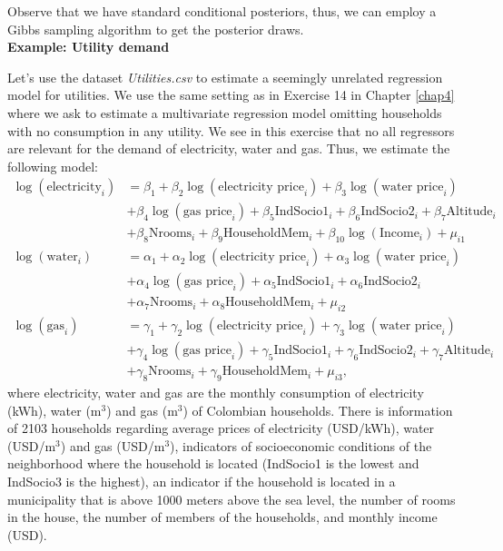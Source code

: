 Observe that we have standard conditional posteriors, thus, we can employ a Gibbs sampling algorithm to get the posterior draws.\\

\textbf{Example: Utility demand}

Let's use the dataset \textit{Utilities.csv} to estimate a seemingly unrelated regression model for utilities. We use the same setting as in Exercise 14 in Chapter \ref{chap4} where we ask to estimate a multivariate regression model omitting households with no consumption in any utility. We see in this exercise that no all regressors are relevant for the demand of electricity, water and gas. Thus, we estimate the following model:
\begin{align*}
	\log(\text{electricity}_i) & = \beta_1 + \beta_2\log(\text{electricity price}_i)+\beta_3\log(\text{water price}_i)\\
	&+\beta_4\log(\text{gas price}_i)+\beta_5\text{IndSocio1}_i+\beta_6\text{IndSocio2}_i+\beta_7\text{Altitude}_i\\
	&+\beta_8\text{Nrooms}_i+\beta_9\text{HouseholdMem}_i+\beta_{10}\log(\text{Income}_i)+\mu_{i1}\\
	\log(\text{water}_i) & = \alpha_1 + \alpha_2\log(\text{electricity price}_i)+\alpha_3\log(\text{water price}_i)\\
	&+\alpha_4\log(\text{gas price}_i)+\alpha_5\text{IndSocio1}_i+\alpha_6\text{IndSocio2}_i\\
	&+\alpha_7\text{Nrooms}_i+\alpha_8\text{HouseholdMem}_i+\mu_{i2}\\
	\log(\text{gas}_i) & = \gamma_1 + \gamma_2\log(\text{electricity price}_i)+\gamma_3\log(\text{water price}_i)\\
	&+\gamma_4\log(\text{gas price}_i)+\gamma_5\text{IndSocio1}_i+\gamma_6\text{IndSocio2}_i+\gamma_7\text{Altitude}_i\\
	&+\gamma_8\text{Nrooms}_i+\gamma_9\text{HouseholdMem}_i+\mu_{i3},
\end{align*} 
where electricity, water and gas are the monthly consumption of electricity (kWh), water (m$^3$) and gas (m$^3$) of Colombian households. There is information of 2103 households regarding average prices of electricity (USD/kWh), water (USD/m$^3$) and gas (USD/m$^3$), indicators of socioeconomic conditions of the neighborhood where the household is located (IndSocio1 is the lowest and IndSocio3 is the highest), an indicator if the household is located in a municipality that is above 1000 meters above the sea level, the number of rooms in the house, the number of members of the households, and monthly income (USD).

